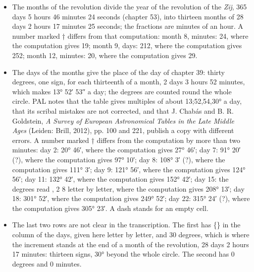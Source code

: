 \documentclass[11pt]{article}
\begin{document}
\begin{itemize}\footnotesize\item The months of the revolution divide the year of the revolution of the \emph{Zīj}, 365 days 5 hours 46 minutes 24 seconds (chapter 53), into thirteen months of 28 days 2 hours 17 minutes 25 seconds; the fractions are minutes of an hour. A number marked † differs from that computation: month 8, minutes: 24, where the computation gives 19; month 9, days: 212, where the computation gives 252; month 12, minutes: 20, where the computation gives 29.\item The days of the months give the place of the day of chapter 39: thirty degrees, one sign, for each thirteenth of a month, 2 days 3 hours 52 minutes, which makes 13° 52′ 53″ a day; the degrees are counted round the whole circle. PAL notes that the table gives multiples of about 13;52,54,30° a day, that its scribal mistakes are not corrected, and that J. Chabás and B. R. Goldstein, \emph{A Survey of European Astronomical Tables in the Late Middle Ages} (Leiden: Brill, 2012), pp. 100 and 221, publish a copy with different errors. A number marked † differs from the computation by more than two minutes: day 2: 20° 46′, where the computation gives 27° 46′; day 7: 91° 20′ (?), where the computation gives 97° 10′; day 8: 108° 3′ (?), where the computation gives 111° 3′; day 9: 121° 56′, where the computation gives 124° 56′; day 11: 132° 42′, where the computation gives 152° 42′; day 15: the degrees read , 2 8 letter by letter, where the computation gives 208° 13′; day 18: 301° 52′, where the computation gives 249° 52′; day 22: 315° 24′ (?), where the computation gives 305° 23′. A dash stands for an empty cell.\item The last two rows are not clear in the transcription. The first has \{\} in the column of the days, given here letter by letter, and 30 degrees, which is where the increment stands at the end of a month of the revolution, 28 days 2 hours 17 minutes: thirteen signs, 30° beyond the whole circle. The second has 0 degrees and 0 minutes.\end{itemize}
\end{document}
